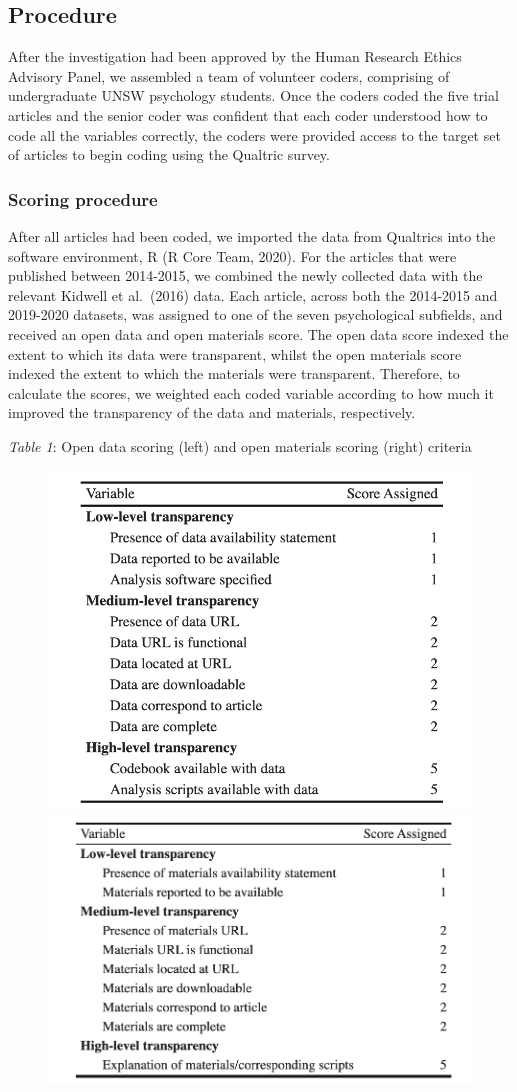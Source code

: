 \documentclass[
  english,
  man,floatsintext]{apa6}
\begin{document}
\hypertarget{procedure}{%
\subsection{Procedure}\label{procedure}}

After the investigation had been approved by the Human Research Ethics Advisory Panel, we assembled a team of volunteer coders, comprising of undergraduate UNSW psychology students. Once the coders coded the five trial articles and the senior coder was confident that each coder understood how to code all the variables correctly, the coders were provided access to the target set of articles to begin coding using the Qualtric survey.

\hypertarget{scoring-procedure}{%
\subsubsection{Scoring procedure}\label{scoring-procedure}}

After all articles had been coded, we imported the data from Qualtrics into the software environment, R (R Core Team, 2020). For the articles that were published between 2014-2015, we combined the newly collected data with the relevant Kidwell et al.~(2016) data. Each article, across both the 2014-2015 and 2019-2020 datasets, was assigned to one of the seven psychological subfields, and received an open data and open materials score. The open data score indexed the extent to which its data were transparent, whilst the open materials score indexed the extent to which the materials were transparent. Therefore, to calculate the scores, we weighted each coded variable according to how much it improved the transparency of the data and materials, respectively.

\emph{Table 1}: Open data scoring (left) and open materials scoring (right) criteria

\begin{figure}

{\centering \includegraphics[width=0.49\linewidth,height=0.2\textheight]{data_scoring} \includegraphics[width=0.49\linewidth,height=0.2\textheight]{mat_scoring} 

}

\end{figure}
\end{document}
